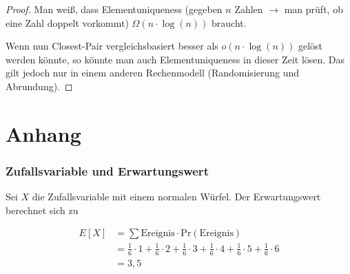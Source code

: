 \documentclass{scrartcl}%
\begin{document}
    \begin{proof}
        Man weiß, dass Elementuniqueness (gegeben $n$ Zahlen $\rightarrow$ man prüft, ob eine Zahl doppelt vorkommt)
        $\Omega(n \cdot \log(n))$ braucht.

        Wenn nun Closest-Pair vergleichsbasiert besser als $o(n \cdot \log(n))$ gelöst werden könnte,
        so könnte man auch Elementuniqueness in dieser Zeit lösen.
        Das gilt jedoch nur in einem anderen Rechenmodell (Randomisierung und Abrundung).
    \end{proof}

    \section*{Anhang}
    \label{sec:anhang}

    \subsubsection*{Zufallsvariable und Erwartungswert}
    \label{sec:zufallsvariableUndErwartungswert}
    Sei $X$ die Zufallsvariable  mit einem normalen Würfel.
    Der Erwartungswert berechnet sich zu

    \begin{align*}
        E[X] & = \sum \text{Ereignis} \cdot \text{Pr}(\text{Ereignis}) \\
        & = \frac{1}{6} \cdot 1 + \frac{1}{6} \cdot 2 + \frac{1}{6} \cdot 3 +
        \frac{1}{6} \cdot 4 + \frac{1}{6} \cdot 5 + \frac{1}{6} \cdot 6 \\
        & = 3,5
    \end{align*}
\end{document}
